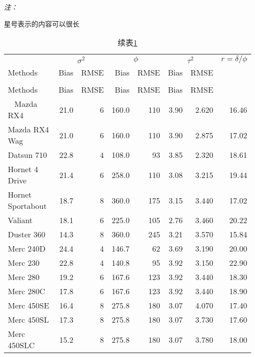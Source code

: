 \documentclass[]{book}
\begin{document}
\begin{ThreePartTable}
\begin{TableNotes}
\item \textit{注：} 
\item * 星号表示的内容可以很长
\end{TableNotes}
\begin{longtable}[t]{lrrrrrrr}
\caption{\label{tab:kableExtra}第1种类型的统计表格样式}\\
\toprule
\multicolumn{1}{c}{ } & \multicolumn{2}{c}{$\sigma^2$} & \multicolumn{2}{c}{$\phi$} & \multicolumn{2}{c}{$\tau^2$} & \multicolumn{1}{c}{$r=\delta/\phi$} \\
\cmidrule(l{3pt}r{3pt}){2-3} \cmidrule(l{3pt}r{3pt}){4-5} \cmidrule(l{3pt}r{3pt}){6-7} \cmidrule(l{3pt}r{3pt}){8-8}
Methods & Bias & RMSE & Bias & RMSE & Bias & RMSE & \\
\midrule
\endfirsthead
\caption[]{续表\ref{tab:kableExtra}}\\
\toprule
Methods & Bias & RMSE & Bias & RMSE & Bias & RMSE & \\
\midrule
\endhead
\
\endfoot
\bottomrule
\insertTableNotes
\endlastfoot
Mazda RX4 & 21.0 & 6 & 160.0 & 110 & 3.90 & 2.620 & 16.46\\
Mazda RX4 Wag & 21.0 & 6 & 160.0 & 110 & 3.90 & 2.875 & 17.02\\
Datsun 710 & 22.8 & 4 & 108.0 & 93 & 3.85 & 2.320 & 18.61\\
Hornet 4 Drive & 21.4 & 6 & 258.0 & 110 & 3.08 & 3.215 & 19.44\\
Hornet Sportabout & 18.7 & 8 & 360.0 & 175 & 3.15 & 3.440 & 17.02\\
Valiant & 18.1 & 6 & 225.0 & 105 & 2.76 & 3.460 & 20.22\\
\midrule
Duster 360 & 14.3 & 8 & 360.0 & 245 & 3.21 & 3.570 & 15.84\\
Merc 240D & 24.4 & 4 & 146.7 & 62 & 3.69 & 3.190 & 20.00\\
Merc 230 & 22.8 & 4 & 140.8 & 95 & 3.92 & 3.150 & 22.90\\
Merc 280 & 19.2 & 6 & 167.6 & 123 & 3.92 & 3.440 & 18.30\\
Merc 280C & 17.8 & 6 & 167.6 & 123 & 3.92 & 3.440 & 18.90\\
Merc 450SE & 16.4 & 8 & 275.8 & 180 & 3.07 & 4.070 & 17.40\\
\midrule
Merc 450SL & 17.3 & 8 & 275.8 & 180 & 3.07 & 3.730 & 17.60\\
Merc 450SLC & 15.2 & 8 & 275.8 & 180 & 3.07 & 3.780 & 18.00\\

\end{longtable}
\end{ThreePartTable}
\end{document}
